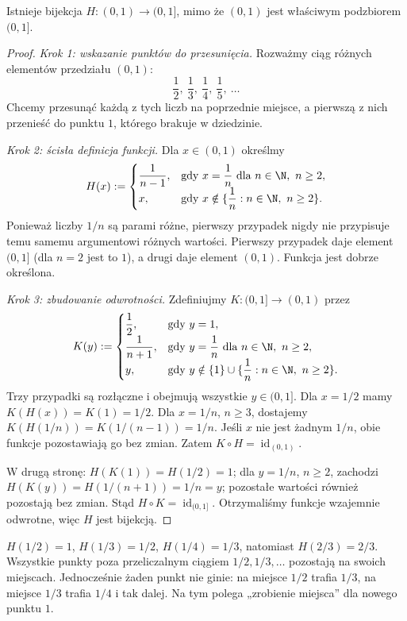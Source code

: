 \begin{twierdzenie}\label{thm:card-open-half-open}
Istnieje bijekcja $H:(0,1)\to(0,1]$, mimo że $(0,1)$
jest właściwym podzbiorem $(0,1]$.
\end{twierdzenie}
\begin{proof}
\emph{Krok 1: wskazanie punktów do przesunięcia.}
Rozważmy ciąg różnych elementów przedziału $(0,1)$:
\[
\frac12,\ \frac13,\ \frac14,\ \frac15,\ \ldots
\]
Chcemy przesunąć każdą z tych liczb na poprzednie miejsce,
a pierwszą z nich przenieść do punktu $1$, którego brakuje
w dziedzinie.

\emph{Krok 2: ścisła definicja funkcji.}
Dla $x\in(0,1)$ określmy
\[
H(x):=
\begin{cases}
\dfrac{1}{n-1},&\text{gdy }x=\dfrac1n\text{ dla }n\in\N,\ n\ge2,\\[3pt]
x,&\text{gdy }x\notin\{\dfrac1n:n\in\N,\ n\ge2\}.
\end{cases}
\]
Ponieważ liczby $1/n$ są parami różne, pierwszy przypadek
nigdy nie przypisuje temu samemu argumentowi różnych wartości.
Pierwszy przypadek daje element $(0,1]$ (dla $n=2$ jest to $1$),
a drugi daje element $(0,1)$. Funkcja jest dobrze określona.

\emph{Krok 3: zbudowanie odwrotności.}
Zdefiniujmy $K:(0,1]\to(0,1)$ przez
\[
K(y):=
\begin{cases}
\dfrac12,&\text{gdy }y=1,\\[3pt]
\dfrac{1}{n+1},&\text{gdy }y=\dfrac1n\text{ dla }n\in\N,\ n\ge2,\\[3pt]
y,&\text{gdy }y\notin\{1\}\cup\{\dfrac1n:n\in\N,\ n\ge2\}.
\end{cases}
\]
Trzy przypadki są rozłączne i obejmują wszystkie $y\in(0,1]$.
Dla $x=1/2$ mamy $K(H(x))=K(1)=1/2$.
Dla $x=1/n$, $n\ge3$, dostajemy
$K(H(1/n))=K(1/(n-1))=1/n$.
Jeśli $x$ nie jest żadnym $1/n$, obie funkcje pozostawiają go bez zmian.
Zatem $K\circ H=\operatorname{id}_{(0,1)}$.

W drugą stronę: $H(K(1))=H(1/2)=1$;
dla $y=1/n$, $n\ge2$, zachodzi
$H(K(y))=H(1/(n+1))=1/n=y$;
pozostałe wartości również pozostają bez zmian.
Stąd $H\circ K=\operatorname{id}_{(0,1]}$.
Otrzymaliśmy funkcje wzajemnie odwrotne, więc $H$ jest bijekcją.
\end{proof}
\begin{przyklad}
$H(1/2)=1$, $H(1/3)=1/2$, $H(1/4)=1/3$,
natomiast $H(2/3)=2/3$.
Wszystkie punkty poza przeliczalnym ciągiem $1/2,1/3,\ldots$
pozostają na swoich miejscach. Jednocześnie żaden punkt nie ginie:
na miejsce $1/2$ trafia $1/3$, na miejsce $1/3$ trafia $1/4$
i tak dalej. Na tym polega „zrobienie miejsca” dla nowego punktu $1$.
\end{przyklad}

